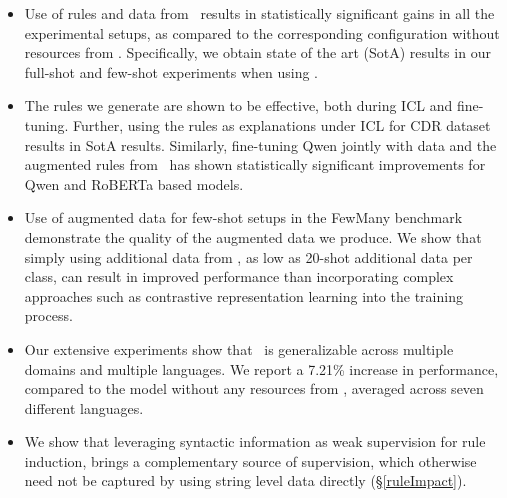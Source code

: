 \begin{itemize}
    \item Use of rules and data from \our~results in statistically significant gains in all the experimental setups, as compared to the corresponding configuration without resources from \our. Specifically, we obtain state of the art (SotA) results in our full-shot and few-shot experiments when using \our.

    \item The rules we generate are shown to be effective, both during ICL and fine-tuning. Further, using the rules as explanations under ICL for CDR dataset results in SotA results. Similarly, fine-tuning Qwen jointly with data and the augmented rules from \our~has shown statistically significant improvements for Qwen and RoBERTa based models.

    \item Use of augmented data for few-shot setups in the {\sc FewMany} benchmark demonstrate the quality of the augmented data we produce. We show that simply using additional data from \our, as low as 20-shot additional data per class, can result in improved performance than incorporating complex approaches such as contrastive representation learning into the training process. 
    

    \item Our extensive experiments show that \our~is generalizable across multiple domains and multiple languages. We report a 7.21\%  increase in performance, compared to the model without any resources from \our, averaged across seven different languages.    

    \item We show that leveraging syntactic information as weak supervision for rule induction, brings a complementary source of supervision, which otherwise need not be captured by using string level data directly (\S \ref{ruleImpact}).
    

    

\end{itemize}


